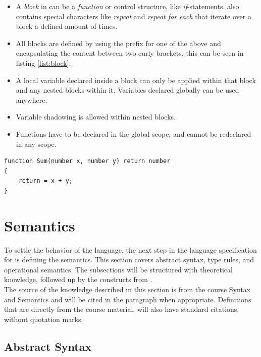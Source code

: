 \begin{itemize}
  \item A \textit{block} in \lang can be a \textit{function} or control structure, like \textit{if}-statements. \lang also contains special characters like \textit{repeat} and \textit{repeat for each} that iterate over a block a defined amount of times.
  \item All blocks are defined by using the prefix for one of the above and encapsulating the content between two curly brackets, this can be seen in listing \ref{list:block}.
  \item A local variable declared inside a block can only be applied within that block and any nested blocks within it. Variables declared globally can be used anywhere.
  \item Variable shadowing is allowed within nested blocks.
  \item  
  Functions have to be declared in the global scope, and cannot be redeclared in any scope. 
\end{itemize}

\begin{lstlisting}[language=scriptkid, label={list:block},caption=Example of a Block]
function Sum(number x, number y) return number 
{ 
    return = x + y; 
} 
\end{lstlisting}

\newpage
\section{Semantics}
To settle the behavior of the language, the next step in the language specification for \lang is defining the semantics. This section covers abstract syntax, type rules, and operational semantics. The subsections will be structured with theoretical knowledge, followed up by the constructs from \lang. \\

The source of the knowledge described in this section is from the course Syntax and Semantics and will be cited in the paragraph when appropriate. Definitions that are directly from the course material, will also have standard citations, without quotation marks.

\subsection{Abstract Syntax} \label{AST}

